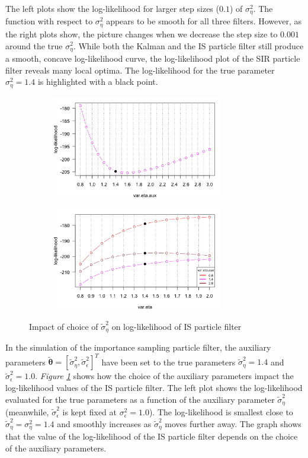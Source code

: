 \documentclass[11pt, oneside]{scrreprt}   	%
\begin{document}
The left plots show the log-likelihood for larger step sizes ($0.1$) of $\sigma_{\eta}^2$. The function with respect to $\sigma_{\eta}^2$ appears to be smooth for all three filters. However, as the right plots show, the picture changes when we decrease the step size to $0.001$ around the true $\sigma_{\eta}^2$. While both the Kalman and the IS particle filter still produce a smooth, concave log-likelihood curve, the log-likelihood plot of the SIR particle filter reveals many local optima. The log-likelihood for the true parameter $\sigma_{\eta}^2 = 1.4$ is highlighted with a black point.\\   

\begin{figure}[h!]
\centering
\begin{subfigure}{0.5\textwidth}
  \centering
  \includegraphics[width=75mm]{../../images/ullm-loglik-aux-eta.png}
\end{subfigure}%
\begin{subfigure}{0.5\textwidth}
  \centering
  \includegraphics[width=75mm]{../../images/ullm-loglik-aux-eta-2.png}
\end{subfigure}
\caption{Impact of choice of $\tilde{\sigma}_{\eta}^2$ on log-likelihood of IS particle filter}
\label{fig:ullm_theta_aux}
\end{figure}

In the simulation of the importance sampling particle filter, the auxiliary parameters $\boldsymbol{\tilde{\theta}}=[\tilde{\sigma}_{\eta}^2, \tilde{\sigma}_{\epsilon}^2]^T$ have been set to the true parameters $\tilde{\sigma}_{\eta}^2=1.4$ and $\tilde{\sigma}_{\epsilon}^2=1.0$. \textit{Figure \ref{fig:ullm_theta_aux}} shows how the choice of the auxiliary parameters impact the log-likelihood values of the IS particle filter. The left plot shows the log-likelihood evaluated for the true parameters as a function of the auxiliary parameter $\tilde{\sigma}_{\eta}^2$ (meanwhile, $\tilde{\sigma}_{\epsilon}^2$ is kept fixed at $\sigma_{\epsilon}^2=1.0$). The log-likelihood is smallest close to $\tilde{\sigma}_{\eta}^2=\sigma_{\eta}^2=1.4$ and smoothly increases as $\tilde{\sigma}_{\eta}^2$ moves further away. The graph shows that the value of the log-likelihood of the IS particle filter depends on the choice of the auxiliary parameters.\\
\end{document}
